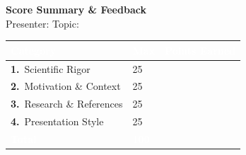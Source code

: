 \documentclass[10pt, letterpaper]{article}
\begin{document}
\begin{center}
  {\large\bfseries\color{headerblue} Score Summary \& Feedback}\\[4pt]
  {\small Presenter: \underline{\hspace{6cm}} \quad Topic: \underline{\hspace{6cm}}}
\end{center}

\vspace{8pt}
\renewcommand{\arraystretch}{1.6}
\setlength{\tabcolsep}{5pt}
\noindent
\begin{tabularx}{\textwidth}{L{9cm} C{2cm} X}
  \textcolor{white}{\textbf{Category}} &
  \textcolor{white}{\textbf{Max}} &
  \textcolor{white}{\textbf{Points Earned}}\\
\midrule
{}  \textbf{1.}\ Scientific Rigor        & 25  & \\
   \textbf{2.}\ Motivation \& Context   & 25  & \\
  \textbf{3.}\ Research \& References  & 25  & \\
   \textbf{4.}\ Presentation Style      & 25  & \\
\midrule
{} \textcolor{white}{\textbf{Total}} & \textcolor{white}{\textbf{100}} & \\
\end{tabularx}

\vspace{12pt}
\vspace{4pt}

\noindent\colorbox{lightgray}{}\\[20pt]


\vspace{8pt}
\noindent\colorbox{rowshade}{}\\[20pt]


\vspace{8pt}
\noindent\colorbox{lightgray}{}\\[20pt]


\vspace{8pt}
\noindent\colorbox{rowshade}{}\\[20pt]
\end{document}
